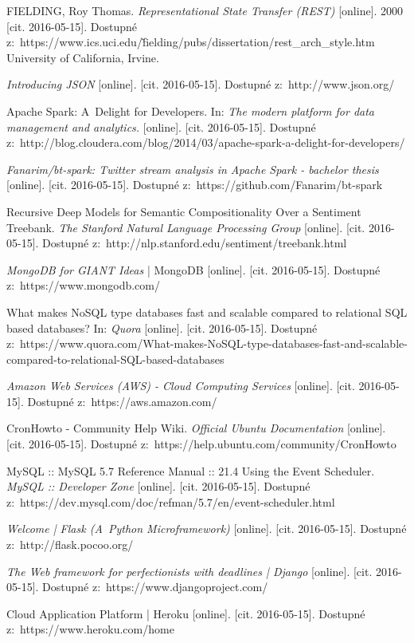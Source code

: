 \documentclass[thesis=B,czech]{FITthesis}[2012/06/26]
\begin{document}
\begin{thebibliography}{1}
FIELDING, Roy Thomas. \textit{Representational State Transfer (REST)} [online]. 2000 [cit. 2016-05-15]. Dostupné z:~https://www.ics.uci.edu/\~fielding/pubs/dissertation/rest\_arch\_style.htm University of California, Irvine.

\textit{Introducing JSON} [online]. [cit. 2016-05-15]. Dostupné z:~http://www.json.org/

Apache Spark: A~Delight for Developers. In: \textit{The modern platform for data management and analytics.} [online]. [cit. 2016-05-15]. Dostupné z:~http://blog.cloudera.com/blog/2014/03/apache-spark-a-delight-for-developers/

\textit{Fanarim/bt-spark: Twitter stream analysis in Apache Spark - bachelor thesis} [online]. [cit. 2016-05-15]. Dostupné z:~https://github.com/Fanarim/bt-spark

Recursive Deep Models for Semantic Compositionality Over a Sentiment Treebank. \textit{The Stanford Natural Language Processing Group }[online]. [cit. 2016-05-15]. Dostupné z:~http://nlp.stanford.edu/sentiment/treebank.html

\textit{MongoDB for GIANT Ideas} | MongoDB [online]. [cit. 2016-05-15]. Dostupné z:~https://www.mongodb.com/

What makes NoSQL type databases fast and scalable compared to relational SQL based databases? In: \textit{Quora} [online]. [cit. 2016-05-15]. Dostupné z:~https://www.quora.com/What-makes-NoSQL-type-databases-fast-and-scalable-compared-to-relational-SQL-based-databases

\textit{Amazon Web Services (AWS) - Cloud Computing Services} [online]. [cit. 2016-05-15]. Dostupné z:~https://aws.amazon.com/

CronHowto - Community Help Wiki. \textit{Official Ubuntu Documentation }[online]. [cit. 2016-05-15]. Dostupné z:~https://help.ubuntu.com/community/CronHowto

MySQL :: MySQL 5.7 Reference Manual :: 21.4 Using the Event Scheduler. \textit{MySQL :: Developer Zone} [online]. [cit. 2016-05-15]. Dostupné z:~https://dev.mysql.com/doc/refman/5.7/en/event-scheduler.html

\textit{Welcome | Flask (A~Python Microframework)} [online]. [cit. 2016-05-15]. Dostupné z:~http://flask.pocoo.org/

\textit{The Web framework for perfectionists with deadlines | Django} [online]. [cit. 2016-05-15]. Dostupné z:~https://www.djangoproject.com/

Cloud Application Platform | Heroku [online]. [cit. 2016-05-15]. Dostupné z:~https://www.heroku.com/home
  
  
\end{thebibliography}
\end{document}
